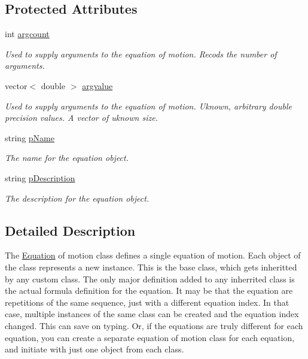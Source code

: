 \subsection*{Protected Attributes}
\begin{DoxyCompactItemize}
\item 
int \hyperlink{class_equationof_motion_ae3a0a566510eaabba1b78c9cad819153}{argcount}
\begin{DoxyCompactList}\small\item\em Used to supply arguments to the equation of motion. Recods the number of arguments. \end{DoxyCompactList}\item 
vector$<$ double $>$ \hyperlink{class_equationof_motion_a5a5b52c663f6f4970d4c99451b8b6bbb}{argvalue}
\begin{DoxyCompactList}\small\item\em Used to supply arguments to the equation of motion. Uknown, arbitrary double precision values. A vector of uknown size. \end{DoxyCompactList}\item 
string \hyperlink{class_equationof_motion_ad4657581e962d18d09c02734c9568006}{p\-Name}
\begin{DoxyCompactList}\small\item\em The name for the equation object. \end{DoxyCompactList}\item 
string \hyperlink{class_equationof_motion_a042a6741c1b526dcb40348dd89a6c5d5}{p\-Description}
\begin{DoxyCompactList}\small\item\em The description for the equation object. \end{DoxyCompactList}\end{DoxyCompactItemize}


\subsection{Detailed Description}
The \hyperlink{class_equation}{Equation} of motion class defines a single equation of motion. Each object of the class represents a new instance. This is the base class, which gets inheritted by any custom class. The only major definition added to any inherrited class is the actual formula definition for the equation. It may be that the equation are repetitions of the same sequence, just with a different equation index. In that case, multiple instances of the same class can be created and the equation index changed. This can save on typing. Or, if the equations are truly different for each equation, you can create a separate equation of motion class for each equation, and initiate with just one object from each class.

